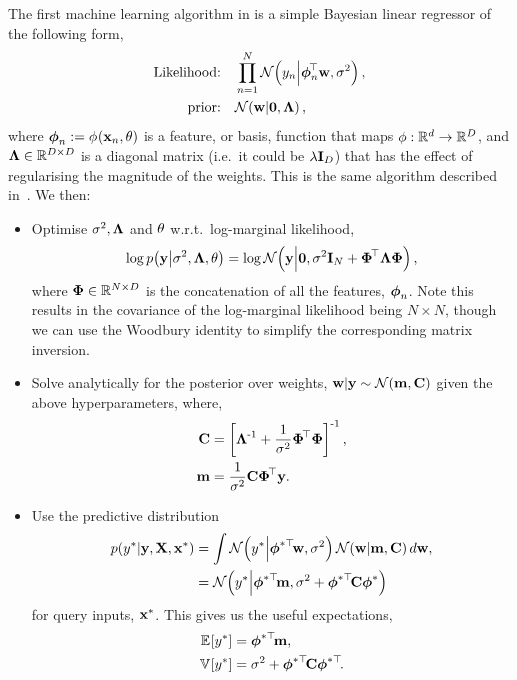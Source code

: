\documentclass[11pt, oneside]{article}
\begin{document}
The first machine learning algorithm in \revrand{} is a simple Bayesian linear
regressor of the following form,
\begin{align}
    \text{Likelihood:} \quad &\prod^N_{n=1} 
    \mathcal{N}\!\left({y_n}\middle\vert{\ensuremath{\boldsymbol\phi}_n\ensuremath{^{\!\top}}\ensuremath{\mathbf{w}}, \ensuremath{\sigma^2}}\right), \label{eq:slm_like}\\
    \text{prior:} \quad &\mathcal{N}\!\left({\mathbf{w}}\middle\vert{\mathbf{0}, \ensuremath{\boldsymbol{\Lambda}}}\right),
    \label{eq:slm_prior}
\end{align}
where $\boldsymbol\phi_n := {\phi}_{}\!\left({{\mathbf{x}_n, \theta}}\right)$ is a feature, or basis,
function that maps $\phi : \mathbb{R}^{d} \to \mathbb{R}^{D}$, and $\boldsymbol{\Lambda} \in
\mathbb{R}^{D\times D}$ is a diagonal matrix (i.e.~it could be $\lambda\mathbf{I}_{D}$) that
has the effect of regularising the magnitude of the weights. This is the same
algorithm described in~\citet[Chapter 2]{Rasmussen2006}. We then:
\begin{itemize}
    \item Optimise $\sigma^2, \boldsymbol{\Lambda}$ and $\theta$ w.r.t.\ log-marginal likelihood,
        \begin{equation}
            \log p\!\left({\mathbf{y}}\middle\vert{\ensuremath{\sigma^2}, \ensuremath{\boldsymbol{\Lambda}}, \ensuremath{\theta}}\right) =
            \log \mathcal{N}\!\left({\mathbf{y}}\middle\vert{\mathbf{0}, \ensuremath{\sigma^2}\ensuremath{\mathbf{I}_{N}} + \ensuremath{\boldsymbol\Phi}\ensuremath{^{\!\top}}\ensuremath{\boldsymbol{\Lambda}}\ensuremath{\boldsymbol\Phi}}\right),
        \end{equation}
        where $\boldsymbol\Phi \in \mathbb{R}^{N \times D}$ is the concatenation of all the
        features, $\boldsymbol\phi_n$. Note this results in the covariance of the
        log-marginal likelihood being $N \times N$, though we can use the
        Woodbury identity to simplify the corresponding matrix inversion.
    \item Solve analytically for the posterior over weights, $\mathbf{w} | \mathbf{y}
        \sim \mathcal{N}\!\left({\mathbf{m}, \mathbf{C}}\right)$ given the above hyperparameters, where,
        \begin{align*}
            \mathbf{C} &= \left[{\boldsymbol{\Lambda}^{\text{-}1} + \frac{1}{\sigma^2}
                \boldsymbol\Phi^{\!\top} \boldsymbol\Phi}\right]^{\text{-}1}, \\
            \mathbf{m} &= \frac{1}{\sigma^2} \mathbf{C} \boldsymbol\Phi^{\!\top} \mathbf{y}.
        \end{align*}
    \item Use the predictive distribution
        \begin{align}
            p\!\left({y^{*}}\middle\vert{\ensuremath{\mathbf{y}}, \ensuremath{\mathbf{X}}, \ensuremath{\mathbf{x}}\ensuremath{^{*}}}\right) &= \int
            \mathcal{N}\!\left({y^{*}}\middle\vert{\ensuremath{\boldsymbol\phi}\ensuremath{^{*\top}\!}\ensuremath{\mathbf{w}}, \ensuremath{\sigma^2}}\right)
            \mathcal{N}\!\left({\mathbf{w}}\middle\vert{\ensuremath{\mathbf{m}}, \ensuremath{\mathbf{C}}}\right) d\mathbf{w}, \nonumber \\
            &= \mathcal{N}\!\left({y^{*}}\middle\vert{\ensuremath{\boldsymbol\phi}\ensuremath{^{*\top}\!}\ensuremath{\mathbf{m}},
                \ensuremath{\sigma^2}+ \ensuremath{\boldsymbol\phi}\ensuremath{^{*\top}\!}\ensuremath{\mathbf{C}}\ensuremath{\boldsymbol\phi}\ensuremath{^{*}}}\right)
        \end{align}
        for query inputs, $\mathbf{x}^{*}$. This gives us the useful expectations,
        \begin{align}
            \mathbb{E}_{}\!\left[{y^{*}}\right] &= \boldsymbol\phi^{*\top}\!\mathbf{m}, \\
            \mathbb{V}_{}\!\left[{y^{*}}\right] &= \sigma^2 + \boldsymbol\phi^{*\top}\!\mathbf{C}\boldsymbol\phi^{*\top}\!.
        \end{align}
\end{itemize}
\end{document}
